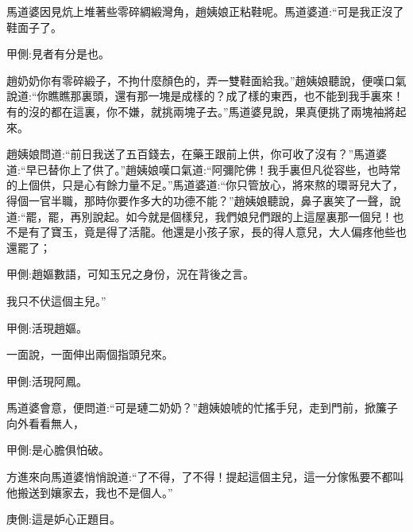 \begin{parag}
    馬道婆因見炕上堆著些零碎綢緞灣角，趙姨娘正粘鞋呢。馬道婆道:“可是我正沒了鞋面子了。\begin{note}甲側:見者有分是也。\end{note}趙奶奶你有零碎緞子，不拘什麼顏色的，弄一雙鞋面給我。”趙姨娘聽說，便嘆口氣說道:“你瞧瞧那裏頭，還有那一塊是成樣的？成了樣的東西，也不能到我手裏來！有的沒的都在這裏，你不嫌，就挑兩塊子去。”馬道婆見說，果真便挑了兩塊袖將起來。
\end{parag}


\begin{parag}
    趙姨娘問道:“前日我送了五百錢去，在藥王跟前上供，你可收了沒有？”馬道婆道:“早已替你上了供了。”趙姨娘嘆口氣道:“阿彌陀佛！我手裏但凡從容些，也時常的上個供，只是心有餘力量不足。”馬道婆道:“你只管放心，將來熬的環哥兒大了，得個一官半職，那時你要作多大的功德不能？”趙姨娘聽說，鼻子裏笑了一聲，說道:“罷，罷，再別說起。如今就是個樣兒，我們娘兒們跟的上這屋裏那一個兒！也不是有了寶玉，竟是得了活龍。他還是小孩子家，長的得人意兒，大人偏疼他些也還罷了；\begin{note}甲側:趙嫗數語，可知玉兄之身份，況在背後之言。\end{note}我只不伏這個主兒。”\begin{note}甲側:活現趙嫗。\end{note}一面說，一面伸出兩個指頭兒來。\begin{note}甲側:活現阿鳳。\end{note}馬道婆會意，便問道:“可是璉二奶奶？”趙姨娘唬的忙搖手兒，走到門前，掀簾子向外看看無人，\begin{note}甲側:是心膽俱怕破。\end{note}方進來向馬道婆悄悄說道:“了不得，了不得！提起這個主兒，這一分傢俬要不都叫他搬送到孃家去，我也不是個人。”\begin{note}庚側:這是妒心正題目。\end{note}
\end{parag}


